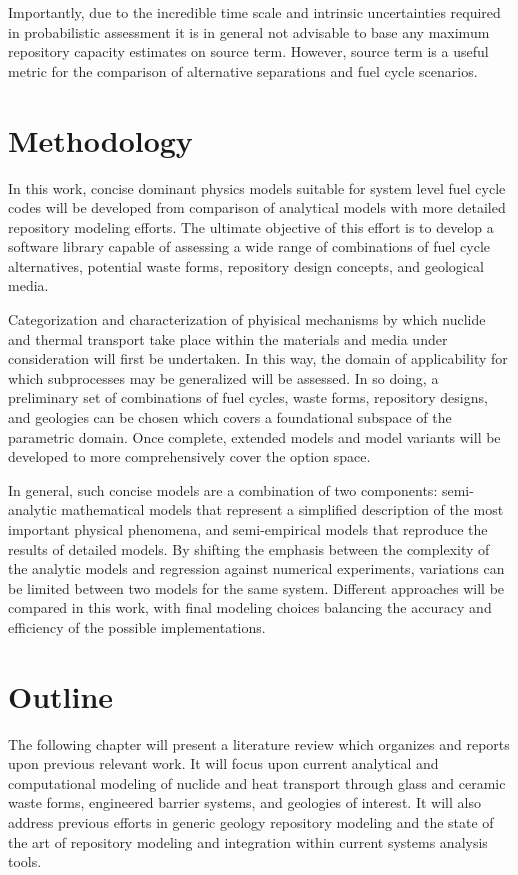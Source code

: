 Importantly, due to the incredible time scale and intrinsic uncertainties required 
in probabilistic assessment it is in general not advisable to base 
any maximum repository capacity estimates on source term. However, 
source term is a useful metric for the comparison of alternative 
separations and fuel cycle scenarios.


\section{Methodology} 

In this work, concise dominant physics models suitable for system 
level fuel cycle codes will be developed from comparison of analytical 
models with more detailed repository modeling efforts. The ultimate 
objective of this effort is to develop a software library capable of 
assessing a wide range of combinations of fuel cycle alternatives, 
potential waste forms, repository design concepts, and geological 
media.  

Categorization and characterization of phyisical mechanisms by which 
nuclide and thermal transport take place within the materials and 
media under consideration will first be undertaken. In this way, the 
domain of applicability for which subprocesses may be generalized will 
be assessed. In so doing, a preliminary set of combinations of fuel 
cycles, waste forms, repository designs, and geologies can be chosen 
which covers a foundational subspace of the parametric domain. Once 
complete, extended models and model variants will be developed to more 
comprehensively cover the option space.  

In general, such concise models are a combination of two components: 
semi-analytic mathematical models that represent a simplified 
description of the most important physical phenomena, and 
semi-empirical models that reproduce the results of detailed models.  
By shifting the emphasis between the complexity of the analytic models 
and regression against numerical experiments, variations can be 
limited between two models for the same system.  Different approaches 
will be compared in this work, with final modeling choices balancing 
the accuracy and efficiency of the possible implementations.  


\section{Outline}

The following chapter will present a literature review which organizes 
and reports upon previous relevant work. It will focus upon current 
analytical and computational modeling of nuclide and heat transport 
through glass and ceramic waste forms, engineered barrier systems, and 
geologies of interest. It will also address previous efforts in 
generic geology repository modeling and the state of the art of 
repository modeling and integration within current systems analysis 
tools. 

